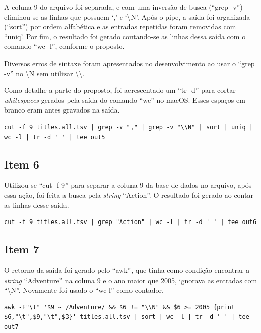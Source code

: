 \documentclass[12pt]{article}
\begin{document}
A coluna 9 do arquivo foi separada, e com uma inversão de busca (``grep -v'') eliminou-se as linhas que possuem `,' e `\textbackslash	N'. Após o pipe, a saída foi organizada (``sort'') por ordem alfabética e as entradas repetidas foram removidas com ``uniq'. Por fim, o resultado foi gerado contando-se as linhas dessa saída com o comando ``wc -l'', conforme o proposto.

Diversos erros de  sintaxe foram apresentados no desenvolvimento ao usar o ``grep -v'' no \textbackslash N sem utilizar \textbackslash\textbackslash .

Como detalhe a parte do proposto, foi acrescentado um ``tr -d'' para cortar \textit{whitespaces} gerados pela saída do comando ``wc'' no macOS. Esses espaços em branco eram antes gravados na saída. 

\begin{verbatim}
cut -f 9 titles.all.tsv | grep -v "," | grep -v "\\N" | sort | uniq | wc -l | tr -d ' ' | tee out5 
\end{verbatim}

\subsection*{Item 6}

Utilizou-se ``cut -f 9'' para separar a coluna 9 da base de dados no arquivo, após essa ação, foi feita a busca pela \textit{string}  ``Action''. O resultado foi gerado ao contar as linhas desse saída.

\begin{verbatim}
cut -f 9 titles.all.tsv | grep "Action" | wc -l | tr -d ' ' | tee out6
\end{verbatim}

\subsection*{Item 7}

O retorno da saída foi gerado pelo ``awk'', que tinha como condição encontrar a \textit{string} ``Adventure'' na coluna 9 e o ano maior que 2005, ignorava as entradas com ``\textbackslash N''. Novamente foi usado o ``wc l'' como contador.

\begin{verbatim}
awk -F"\t" '$9 ~ /Adventure/ && $6 != "\\N" && $6 >= 2005 {print $6,"\t",$9,"\t",$3}' titles.all.tsv | sort | wc -l | tr -d ' ' | tee out7
\end{verbatim}
\end{document}
